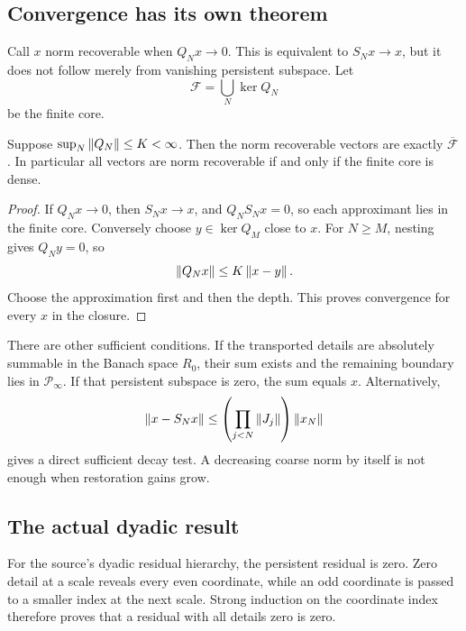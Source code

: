 \subsection{Convergence has its own theorem}
Call \(x\) norm recoverable when \(Q_Nx\to0\). This is equivalent to \(S_Nx\to x\), but it does not follow merely from vanishing persistent subspace. Let
\[
 \mathcal F=\bigcup_N\ker Q_N
\]
be the finite core.

\begin{theorem}\label{KS27}
Suppose \(\sup_N\left\lVert Q_N\right\rVert\le K<\infty\). Then the norm recoverable vectors are exactly \(\overline{\mathcal F}\). In particular all vectors are norm recoverable if and only if the finite core is dense.
\end{theorem}
\begin{proof}
If \(Q_Nx\to0\), then \(S_Nx\to x\), and \(Q_NS_Nx=0\), so each approximant lies in the finite core. Conversely choose \(y\in\ker Q_M\) close to \(x\). For \(N\ge M\), nesting gives \(Q_Ny=0\), so
\[
 \left\lVert Q_Nx\right\rVert\le K\left\lVert x-y\right\rVert.
\]
Choose the approximation first and then the depth. This proves convergence for every \(x\) in the closure.
\end{proof}
There are other sufficient conditions. If the transported details are absolutely summable in the Banach space \(R_0\), their sum exists and the remaining boundary lies in \(\mathcal P_\infty\). If that persistent subspace is zero, the sum equals \(x\). Alternatively,
\[
 \left\lVert x-S_Nx\right\rVert\le\left(\prod_{j<N}\left\lVert J_j\right\rVert\right)\left\lVert x_N\right\rVert
\]
gives a direct sufficient decay test. A decreasing coarse norm by itself is not enough when restoration gains grow.

\subsection{The actual dyadic result}
For the source's dyadic residual hierarchy, the persistent residual is zero. Zero detail at a scale reveals every even coordinate, while an odd coordinate is passed to a smaller index at the next scale. Strong induction on the coordinate index therefore proves that a residual with all details zero is zero.

